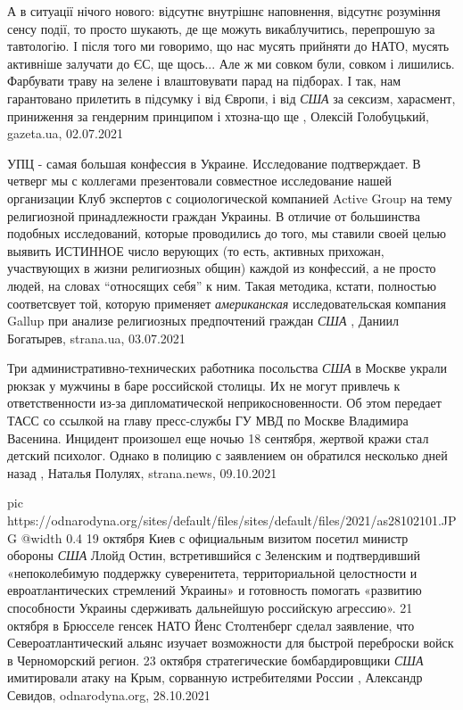 А в ситуації нічого нового: відсутнє внутрішнє наповнення, відсутнє розуміння
сенсу події, то просто шукають, де ще можуть викаблучитись, перепрошую за
тавтологію.  І після того ми говоримо, що нас мусять прийняти до НАТО, мусять
активніше залучати до ЄС, ще щось... Але ж ми совком були, совком і лишились.
Фарбувати траву на зелене і влаштовувати парад на підборах.  І так, нам
гарантовано прилетить в підсумку і від Європи, і від \emph{США} за сексизм,
харасмент, приниження за гендерним принципом і хтозна-що ще
, 
Олексій Голобуцький, gazeta.ua, 02.07.2021

УПЦ - самая большая конфессия в Украине. Исследование подтверждает.
В четверг мы с коллегами презентовали совместное исследование нашей организации
Клуб экспертов с социологической компанией Active Group на тему религиозной
принадлежности граждан Украины. В отличие от большинства подобных исследований,
которые проводились до того, мы ставили своей целью выявить ИСТИННОЕ число
верующих (то есть, активных прихожан, участвующих в жизни религиозных общин)
каждой из конфессий, а не просто людей, на словах \enquote{относящих себя} к ним. Такая
методика, кстати, полностью соответсвует той, которую применяет \emph{американская}
исследовательская компания Gallup при анализе религиозных предпочтений граждан
\emph{США}
, 
Даниил Богатырев, strana.ua, 03.07.2021

Три административно-технических работника посольства \emph{США} в Москве украли рюкзак
у мужчины в баре российской столицы. Их не могут привлечь к ответственности
из-за дипломатической неприкосновенности.  Об этом передает ТАСС со ссылкой на
главу пресс-службы ГУ МВД по Москве Владимира Васенина.  Инцидент произошел еще
ночью 18 сентября, жертвой кражи стал детский психолог.  Однако в полицию с
заявлением он обратился несколько дней назад
, 
Наталья Полулях, strana.news, 09.10.2021

\ifcmt
  pic https://odnarodyna.org/sites/default/files/sites/default/files/2021/as28102101.JPG
  @width 0.4
\fi
19 октября Киев с официальным визитом посетил министр обороны \emph{США} Ллойд Остин,
встретившийся с Зеленским и подтвердивший «непоколебимую поддержку
суверенитета, территориальной целостности и евроатлантических стремлений
Украины» и готовность помогать «развитию способности Украины сдерживать
дальнейшую российскую агрессию».  21 октября в Брюсселе генсек НАТО Йенс
Столтенберг сделал заявление, что Североатлантический альянс изучает
возможности для быстрой переброски войск в Черноморский регион.  23 октября
стратегические бомбардировщики \emph{США} имитировали атаку на Крым, сорванную
истребителями России
, 
Александр Севидов, odnarodyna.org, 28.10.2021

